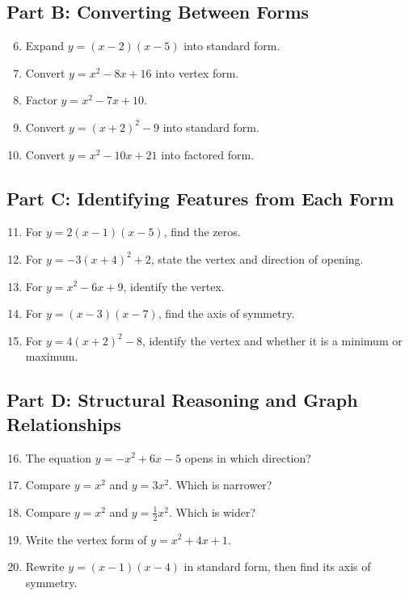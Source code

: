 \documentclass[12pt]{article}
\begin{document}
\subsection*{Part B: Converting Between Forms}
\begin{enumerate}
  \setcounter{enumi}{5}
  \item Expand \(y = (x - 2)(x - 5)\) into standard form.
  \item Convert \(y = x^2 - 8x + 16\) into vertex form.
  \item Factor \(y = x^2 - 7x + 10\).
  \item Convert \(y = (x + 2)^2 - 9\) into standard form.
  \item Convert \(y = x^2 - 10x + 21\) into factored form.
\end{enumerate}

\subsection*{Part C: Identifying Features from Each Form}
\begin{enumerate}
  \setcounter{enumi}{10}
  \item For \(y = 2(x - 1)(x - 5)\), find the zeros.
  \item For \(y = -3(x + 4)^2 + 2\), state the vertex and direction of opening.
  \item For \(y = x^2 - 6x + 9\), identify the vertex.
  \item For \(y = (x - 3)(x - 7)\), find the axis of symmetry.
  \item For \(y = 4(x + 2)^2 - 8\), identify the vertex and whether it is a minimum or maximum.
\end{enumerate}

\subsection*{Part D: Structural Reasoning and Graph Relationships}
\begin{enumerate}
  \setcounter{enumi}{15}
  \item The equation \(y = -x^2 + 6x - 5\) opens in which direction?
  \item Compare \(y = x^2\) and \(y = 3x^2\). Which is narrower?
  \item Compare \(y = x^2\) and \(y = \tfrac{1}{2}x^2\). Which is wider?
  \item Write the vertex form of \(y = x^2 + 4x + 1\).
  \item Rewrite \(y = (x - 1)(x - 4)\) in standard form, then find its axis of symmetry.
\end{enumerate}
\end{document}
